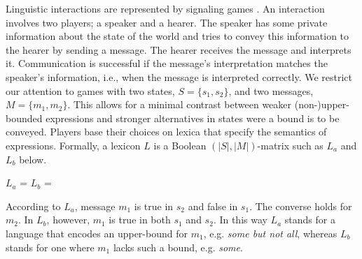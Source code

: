\documentclass[10pt,a4paper]{article}
\begin{document}
Linguistic interactions are represented by signaling games \citep{lewis:1969}. An interaction involves two players; a speaker and a hearer. The speaker has some private information about the state of the world and tries to convey this information to the hearer by sending a message. The hearer receives the message and interprets it. Communication is successful if the message's interpretation matches the speaker's information, i.e., when the message is interpreted correctly. We restrict our attention to games with two states, $S = \{s_1,s_2\}$, and two messages, $M = \{m_1,m_2\}$. This allows for a minimal contrast between weaker (non-)upper-bounded expressions and stronger alternatives in states were a bound is to be conveyed. Players base their choices on lexica that specify the semantics of expressions. Formally, a lexicon $L$ is a Boolean $(|S|,|M|)$-matrix such as $L_{a}$ and $L_{b}$ below.\\

\begin{centering}
$L_a$ =  \hspace{2cm} $L_b$ = \\[0.5cm]
\end{centering}

According to $L_a$, message $m_1$ is true in $s_2$ and false in $s_1$. The converse holds for $m_2$. In $L_b$, however, $m_1$ is true in both $s_1$ and $s_2$. In this way $L_a$ stands for a language that encodes an upper-bound for $m_1$, e.g. {\em some but not all}, whereas $L_b$ stands for one where $m_1$ lacks such a bound, e.g. {\em some}.
\end{document}
